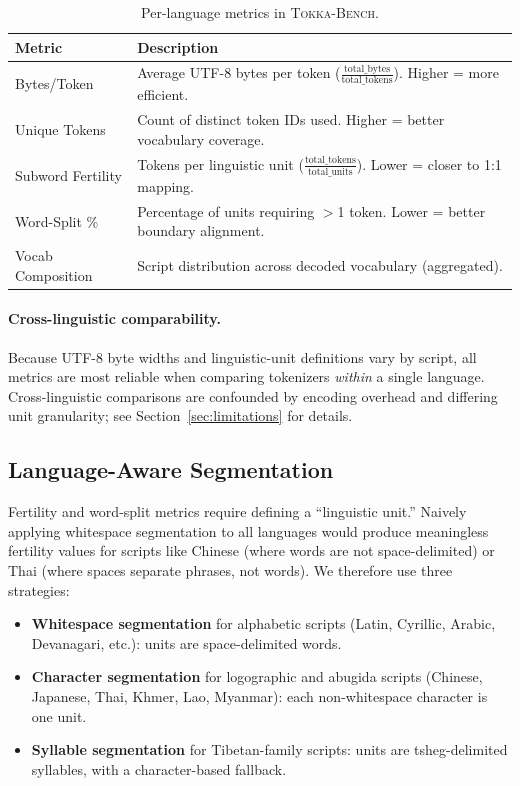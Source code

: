 \documentclass[11pt]{article}
\begin{document}
\begin{table}[t]
\centering
\small
\begin{tabular}{@{}lp{4.6cm}@{}}
\toprule
\textbf{Metric} & \textbf{Description} \\
\midrule
Bytes/Token & Average UTF-8 bytes per token ($\frac{\text{total\_bytes}}{\text{total\_tokens}}$). Higher = more efficient. \\[2pt]
Unique Tokens & Count of distinct token IDs used. Higher = better vocabulary coverage. \\[2pt]
Subword Fertility & Tokens per linguistic unit ($\frac{\text{total\_tokens}}{\text{total\_units}}$). Lower = closer to 1:1 mapping. \\[2pt]
Word-Split \% & Percentage of units requiring $>$1 token. Lower = better boundary alignment. \\[2pt]
Vocab Composition & Script distribution across decoded vocabulary (aggregated). \\
\bottomrule
\end{tabular}
\caption{Per-language metrics in \textsc{Tokka-Bench}.}
\label{tab:metrics}
\end{table}

\paragraph{Cross-linguistic comparability.}
Because UTF-8 byte widths and linguistic-unit definitions vary by script, all metrics are most reliable when comparing tokenizers \emph{within} a single language.
Cross-linguistic comparisons are confounded by encoding overhead and differing unit granularity; see Section~\ref{sec:limitations} for details.

\subsection{Language-Aware Segmentation}
\label{sec:segmentation}

Fertility and word-split metrics require defining a ``linguistic unit.''
Naively applying whitespace segmentation to all languages would produce meaningless fertility values for scripts like Chinese (where words are not space-delimited) or Thai (where spaces separate phrases, not words).
We therefore use three strategies:
\begin{itemize}
\item \textbf{Whitespace segmentation} for alphabetic scripts (Latin, Cyrillic, Arabic, Devanagari, etc.): units are space-delimited words.
\item \textbf{Character segmentation} for logographic and abugida scripts (Chinese, Japanese, Thai, Khmer, Lao, Myanmar): each non-whitespace character is one unit.
\item \textbf{Syllable segmentation} for Tibetan-family scripts: units are tsheg-delimited syllables, with a character-based fallback.
\end{itemize}
\end{document}
